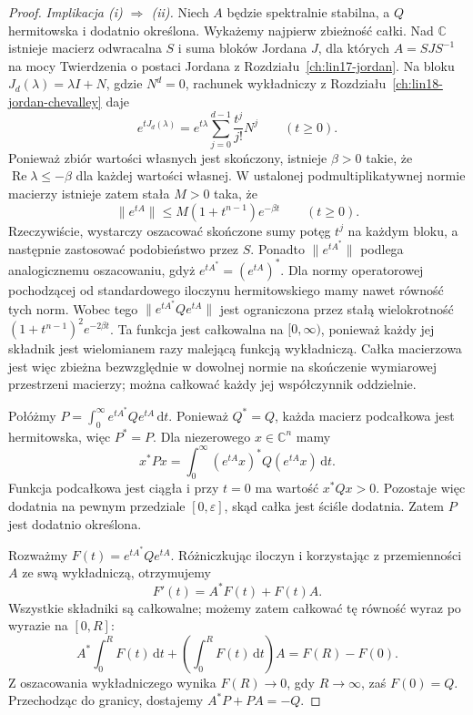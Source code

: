 \begin{proof}
\emph{Implikacja (i) \(\Rightarrow\) (ii).}
Niech \(A\) będzie spektralnie stabilna,
a \(Q\) hermitowska i dodatnio określona.
Wykażemy najpierw zbieżność całki.
Nad \(\mathbb C\) istnieje
macierz odwracalna \(S\)
i suma bloków Jordana \(J\),
dla których \(A=SJS^{-1}\)
na mocy
Twierdzenia o postaci Jordana
z Rozdziału~\ref{ch:lin17-jordan}.
Na bloku \(J_d(\lambda)=\lambda I+N\),
gdzie \(N^d=0\),
rachunek wykładniczy
z Rozdziału~\ref{ch:lin18-jordan-chevalley}
daje
\[
 e^{tJ_d(\lambda)}
 =e^{t\lambda}
  \sum_{j=0}^{d-1}\frac{t^j}{j!}N^j
 \qquad(t\ge0).
\]
Ponieważ zbiór wartości własnych
jest skończony, istnieje \(\beta>0\)
takie, że
\(\operatorname{Re}\lambda\le-\beta\)
dla każdej wartości własnej.
W ustalonej podmultiplikatywnej
normie macierzy istnieje zatem
stała \(M>0\) taka, że
\[
 \|e^{tA}\|
 \le M(1+t^{n-1})e^{-\beta t}
 \qquad(t\ge0).
\]
Rzeczywiście, wystarczy oszacować
skończone sumy potęg \(t^j\)
na każdym bloku, a następnie
zastosować podobieństwo przez \(S\).
Ponadto
\(\|e^{tA^*}\|\) podlega
analogicznemu oszacowaniu,
gdyż \(e^{tA^*}=(e^{tA})^*\).
Dla normy operatorowej pochodzącej
od standardowego iloczynu
hermitowskiego mamy nawet równość
tych norm.
Wobec tego
\(\|e^{tA^*}Qe^{tA}\|\)
jest ograniczona przez stałą
wielokrotność
\((1+t^{n-1})^2e^{-2\beta t}\).
Ta funkcja jest całkowalna
na \([0,\infty)\), ponieważ
każdy jej składnik jest
wielomianem razy malejącą
funkcją wykładniczą.
Całka macierzowa jest więc
zbieżna bezwzględnie
w dowolnej normie
na skończenie wymiarowej przestrzeni
macierzy; można całkować
każdy jej współczynnik oddzielnie.

Połóżmy
\(P=\int_0^\infty e^{tA^*}Qe^{tA}\,\mathrm dt\).
Ponieważ \(Q^*=Q\),
każda macierz podcałkowa
jest hermitowska,
więc \(P^*=P\).
Dla niezerowego \(x\in\mathbb C^n\)
mamy
\[
 x^*Px=\int_0^\infty
       (e^{tA}x)^*Q(e^{tA}x)\,\mathrm dt.
\]
Funkcja podcałkowa jest ciągła
i przy \(t=0\) ma wartość
\(x^*Qx>0\).
Pozostaje więc dodatnia
na pewnym przedziale
\([0,\varepsilon]\), skąd
całka jest ściśle dodatnia.
Zatem \(P\) jest dodatnio określona.

Rozważmy
\(F(t)=e^{tA^*}Qe^{tA}\).
Różniczkując iloczyn i korzystając
z przemienności \(A\)
ze swą wykładniczą,
otrzymujemy
\[
 F'(t)=A^*F(t)+F(t)A.
\]
Wszystkie składniki są całkowalne;
możemy zatem całkować tę równość
wyraz po wyrazie na \([0,R]\):
\[
 A^*\int_0^R F(t)\,\mathrm dt
 +\left(\int_0^R F(t)\,\mathrm dt\right)A
 =F(R)-F(0).
\]
Z oszacowania wykładniczego
wynika \(F(R)\to0\), gdy \(R\to\infty\),
zaś \(F(0)=Q\).
Przechodząc do granicy,
dostajemy \(A^*P+PA=-Q\).


\end{proof}
